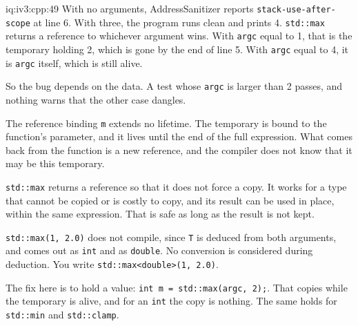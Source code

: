 \begin{solution}{iq:iv3:cpp:49}
With no arguments, AddressSanitizer reports \texttt{stack-use-after-scope} at line 6. With three, the program runs clean and prints 4. \texttt{std::max} returns a reference to whichever argument wins. With \texttt{argc} equal to 1, that is the temporary holding 2, which is gone by the end of line 5. With \texttt{argc} equal to 4, it is \texttt{argc} itself, which is still alive.

So the bug depends on the data. A test whose \texttt{argc} is larger than 2 passes, and nothing warns that the other case dangles.

The reference binding \texttt{m} extends no lifetime. The temporary is bound to the function's parameter, and it lives until the end of the full expression. What comes back from the function is a new reference, and the compiler does not know that it may be this temporary.

\texttt{std::max} returns a reference so that it does not force a copy. It works for a type that cannot be copied or is costly to copy, and its result can be used in place, within the same expression. That is safe as long as the result is not kept.

\texttt{std::max(1, 2.0)} does not compile, since \texttt{T} is deduced from both arguments, and comes out as \texttt{int} and as \texttt{double}. No conversion is considered during deduction. You write \texttt{std::max<double>(1, 2.0)}.

The fix here is to hold a value: \texttt{int m = std::max(argc, 2);}. That copies while the temporary is alive, and for an \texttt{int} the copy is nothing. The same holds for \texttt{std::min} and \texttt{std::clamp}.

\end{solution}

